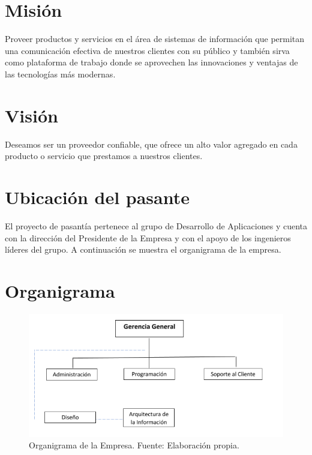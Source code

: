 \section{Misión}
Proveer productos y servicios en el área de sistemas de información que permitan una comunicación efectiva de nuestros clientes con su público y también sirva como plataforma de trabajo donde se aprovechen las innovaciones y ventajas de las tecnologías más modernas.

\section{Visión}
Deseamos ser un proveedor confiable, que ofrece un alto valor agregado en cada producto o servicio que prestamos a nuestros clientes.

\section{Ubicación del pasante}
El proyecto de pasantía pertenece al grupo de Desarrollo de Aplicaciones y cuenta con la dirección del Presidente de la Empresa y con el apoyo de los ingenieros líderes del grupo. A continuación se muestra el organigrama de la empresa.


\pagebreak
\section{Organigrama}
\begin{figure}[hbt]
\begin{center}
\includegraphics[scale=0.8]{organigrama}
\caption{Organigrama de la Empresa. Fuente: Elaboración propia.}
\label{fig:figura1}
\end{center}
\end{figure}
